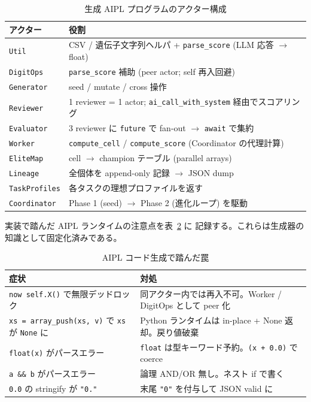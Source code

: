 \documentclass[a4paper,11pt]{article}
\begin{document}
\begin{table}[h]
\centering
\caption{生成 AIPL プログラムのアクター構成}
\label{tab:abcl}
\small
\begin{tabularx}{\linewidth}{lX}
\toprule
アクター & 役割 \\
\midrule
\texttt{Util}            & CSV / 遺伝子文字列ヘルパ + \texttt{parse\_score} (LLM 応答 \(\to\) float) \\
\texttt{DigitOps}        & \texttt{parse\_score} 補助 (peer actor; self 再入回避) \\
\texttt{Generator}       & seed / mutate / cross 操作 \\
\texttt{Reviewer}        & 1 reviewer = 1 actor; \texttt{ai\_call\_with\_system} 経由でスコアリング \\
\texttt{Evaluator}       & 3 reviewer に \texttt{future} で fan-out \(\to\) \texttt{await} で集約 \\
\texttt{Worker}          & \texttt{compute\_cell} / \texttt{compute\_score} (Coordinator の代理計算) \\
\texttt{EliteMap}        & cell \(\to\) champion テーブル (parallel arrays) \\
\texttt{Lineage}         & 全個体を append-only 記録 \(\to\) JSON dump \\
\texttt{TaskProfiles}    & 各タスクの理想プロファイルを返す \\
\texttt{Coordinator}     & Phase 1 (seed) \(\to\) Phase 2 (進化ループ) を駆動 \\
\bottomrule
\end{tabularx}
\end{table}

実装で踏んだ AIPL ランタイムの注意点を表~\ref{tab:abcl_pitfalls} に
記録する。これらは生成器の知識として固定化済みである。

\begin{table}[h]
\centering
\caption{AIPL コード生成で踏んだ罠}
\label{tab:abcl_pitfalls}
\footnotesize
\begin{tabularx}{\linewidth}{lX}
\toprule
症状 & 対処 \\
\midrule
\texttt{now self.X()} で無限デッドロック        & 同アクター内では再入不可。Worker / DigitOps として peer 化 \\
\texttt{xs = array\_push(xs, v)} で \texttt{xs} が \texttt{None} に & Python ランタイムは in-place + None 返却。戻り値破棄 \\
\texttt{float(x)} がパースエラー                & \texttt{float} は型キーワード予約。\texttt{(x + 0.0)} で coerce \\
\texttt{a \&\& b} がパースエラー                & 論理 AND/OR 無し。ネスト if で書く \\
\texttt{0.0} の stringify が \texttt{"0."}      & 末尾 \texttt{"0"} を付与して JSON valid に \\
\bottomrule
\end{tabularx}
\end{table}
\end{document}
